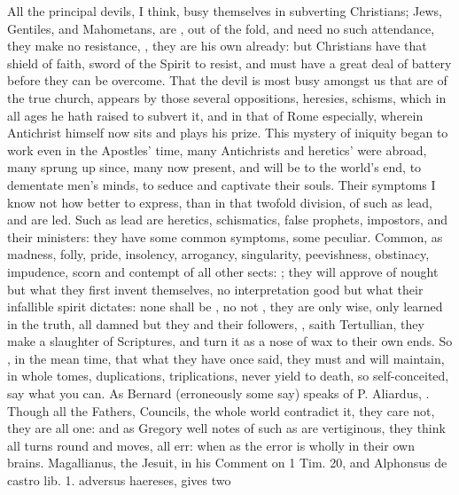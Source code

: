 {All the principal devils, I think, busy themselves in subverting
Christians; Jews, Gentiles, and Mahometans, are , out of
the fold, and need no such attendance, they make no resistance,
,
they are his own already: but Christians have that shield of faith,
sword of the Spirit to resist, and must have a great deal of battery
before they can be overcome. That the devil is most busy amongst us
that are of the true church, appears by those several oppositions,
heresies, schisms, which in all ages he hath raised to subvert it, and
in that of Rome especially, wherein Antichrist himself now sits and
plays his prize. This mystery of iniquity began to work even in the
Apostles' time, many Antichrists and heretics' were abroad, many sprung
up since, many now present, and will be to the world's end, to
dementate men's minds, to seduce and captivate their souls. Their
symptoms I know not how better to express, than in that twofold
division, of such as lead, and are led. Such as lead are heretics,
schismatics, false prophets, impostors, and their ministers: they have
some common symptoms, some peculiar. Common, as madness, folly, pride,
insolency, arrogancy, singularity, peevishness, obstinacy, impudence,
scorn and contempt of all other sects: ; they will approve of nought but what they first invent
themselves, no interpretation good but what their infallible spirit
dictates: none shall be , no not , they are only
wise, only learned in the truth, all damned but they and their
followers, , saith
Tertullian, they make a slaughter of Scriptures, and turn it as a nose
of wax to their own ends. So , in the mean time, that what
they have once said, they must and will maintain, in whole tomes,
duplications, triplications, never yield to death, so self-conceited,
say what you can. As Bernard (erroneously some say) speaks of P.
Aliardus, . Though all the Fathers,
Councils, the whole world contradict it, they care not, they are all
one: and as  Gregory well notes of such as are vertiginous, they
think all turns round and moves, all err: when as the error is wholly
in their own brains. Magallianus, the Jesuit, in his Comment on 1 Tim.
 20, and Alphonsus \textlatin{de castro lib. 1. adversus haereses}, gives two
}
